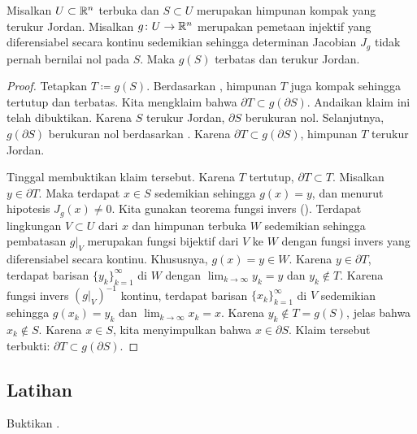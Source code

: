 \begin{prop} \label{prop:imagejordanmeas}
Misalkan $U \subset {\mathbb{R}}^n$ terbuka dan
$S \subset U$ merupakan himpunan kompak yang terukur Jordan.
Misalkan
$g \colon U \to {\mathbb{R}}^n$ merupakan pemetaan injektif
yang diferensiabel secara kontinu sedemikian sehingga
determinan Jacobian $J_g$ tidak pernah bernilai nol pada $S$.
Maka $g(S)$ terbatas dan terukur Jordan.
\end{prop}

\begin{proof}
Tetapkan $T \coloneqq g(S)$.  %
Berdasarkan
,
himpunan
$T$ juga kompak sehingga tertutup dan terbatas.
Kita mengklaim bahwa $\partial T \subset g(\partial S)$.  Andaikan klaim ini
telah dibuktikan.  Karena $S$ terukur Jordan,
$\partial S$ berukuran nol.  Selanjutnya, $g(\partial S)$ berukuran
nol berdasarkan .  Karena $\partial T \subset g(\partial
S)$, himpunan $T$ terukur Jordan.

Tinggal membuktikan klaim tersebut.
Karena $T$ tertutup, $\partial T \subset T$.
Misalkan $y \in \partial T$.  Maka terdapat
$x \in S$
sedemikian sehingga $g(x) = y$, dan menurut hipotesis $J_g(x) \neq 0$.
Kita gunakan teorema fungsi invers ().  Terdapat
lingkungan $V \subset U$ dari $x$ dan himpunan terbuka $W$ sedemikian sehingga
pembatasan $g|_V$ merupakan fungsi bijektif dari $V$ ke $W$
dengan fungsi invers yang diferensiabel secara kontinu.  Khususnya, $g(x) = y \in W$.
Karena $y \in \partial T$, terdapat barisan $\{ y_k \}_{k=1}^\infty$ di $W$ dengan
$\lim_{k\to\infty} y_k = y$ dan $y_k \notin T$.  Karena fungsi invers
$(g|_V)^{-1}$ kontinu, terdapat
barisan $\{ x_k \}_{k=1}^\infty$ di $V$ sedemikian sehingga $g(x_k) = y_k$ dan
$\lim_{k\to\infty} x_k = x$.
Karena $y_k \notin T = g(S)$, jelas bahwa $x_k \notin S$.  Karena $x \in S$, kita
menyimpulkan bahwa $x \in \partial S$.  Klaim tersebut terbukti: $\partial T \subset
g(\partial S)$.
\end{proof}

\subsection{Latihan}

\begin{exercise}
Buktikan .
\end{exercise}

